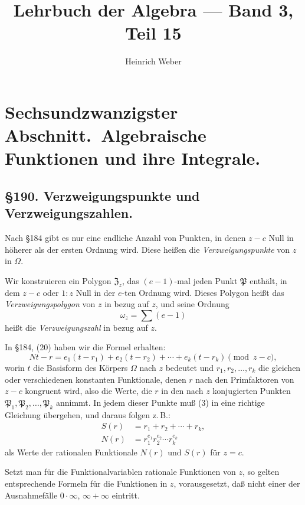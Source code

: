 \documentclass[12pt,a4paper]{article}
\title{Lehrbuch der Algebra --- Band 3, Teil 15}
\author{Heinrich Weber}
\date{}
\begin{document}
\maketitle
\thispagestyle{empty}

\section*{Sechsundzwanzigster Abschnitt.\ Algebraische Funktionen und ihre Integrale.}

\subsection*{\S 190. Verzweigungspunkte und Verzweigungszahlen.}

Nach \S 184 gibt es nur eine endliche Anzahl von Punkten, in denen $z-c$ Null in höherer als der ersten Ordnung wird. Diese heißen die \emph{Verzweigungspunkte} von $z$ in $\Omega$.

Wir konstruieren ein Polygon $\mathfrak{Z}_z$, das $(e-1)$-mal jeden Punkt $\mathfrak{P}$ enthält, in dem $z-c$ oder $1:z$ Null in der $e$-ten Ordnung wird. Dieses Polygon heißt das \emph{Verzweigungspolygon} von $z$ in bezug auf $z$, und seine Ordnung
\begin{equation}\label{eq:190-2}
\omega_z = \sum (e-1)
\end{equation}
heißt die \emph{Verzweigungszahl} in bezug auf $z$.

In \S 184, (20) haben wir die Formel erhalten:
\begin{equation}\label{eq:190-3}
Nt - r = e_1(t-r_1) + e_2(t-r_2) + \cdots + e_k(t-r_k) \pmod{z-c},
\end{equation}
worin $t$ die Basisform des Körpers $\Omega$ nach $z$ bedeutet und $r_1, r_2, \ldots, r_k$ die gleichen oder verschiedenen konstanten Funktionale, denen $r$ nach den Primfaktoren von $z-c$ kongruent wird, also die Werte, die $r$ in den nach $z$ konjugierten Punkten $\mathfrak{P}_1, \mathfrak{P}_2, \ldots, \mathfrak{P}_k$ annimmt. In jedem dieser Punkte muß (3) in eine richtige Gleichung übergehen, und daraus folgen z.\,B.:
\begin{align}
S(r) &= r_1 + r_2 + \cdots + r_k, \label{eq:190-4}\\
N(r) &= r_1^{e_1} r_2^{e_2} \cdots r_k^{e_k} \label{eq:190-5}
\end{align}
als Werte der rationalen Funktionale $N(r)$ und $S(r)$ für $z = c$.

Setzt man für die Funktionalvariablen rationale Funktionen von $z$, so gelten entsprechende Formeln für die Funktionen in $z$, vorausgesetzt, daß nicht einer der Ausnahmefälle $0 \cdot \infty$, $\infty + \infty$ eintritt.
\end{document}
